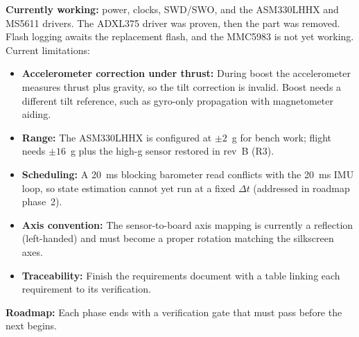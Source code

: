 \documentclass[10pt,letterpaper]{article}
\begin{document}
\textbf{Currently working:} power, clocks, SWD/SWO, and the ASM330LHHX and MS5611 drivers. The ADXL375 driver was proven, then the part was removed. Flash logging awaits the replacement flash, and the MMC5983 is not yet working. Current limitations:
\begin{itemize}
\item \textbf{Accelerometer correction under thrust:} During boost the accelerometer measures
  thrust plus gravity, so the tilt correction is invalid. Boost needs a different tilt reference,
  such as gyro-only propagation with magnetometer aiding.
\item \textbf{Range:} The ASM330LHHX is configured at $\pm2$~g for bench work; flight needs
  $\pm16$~g plus the high-g sensor restored in rev~B (R3).
\item \textbf{Scheduling:} A 20~ms blocking barometer read conflicts with the 20~ms IMU loop, so
  state estimation cannot yet run at a fixed $\Delta t$ (addressed in roadmap phase~2).
\item \textbf{Axis convention:} The sensor-to-board axis mapping is currently a reflection
  (left-handed) and must become a proper rotation matching the silkscreen axes.
\item \textbf{Traceability:} Finish the requirements document with a table linking each
  requirement to its verification.
\end{itemize}
\textbf{Roadmap:} Each phase ends with a verification gate that must pass before the next begins.
\end{document}
